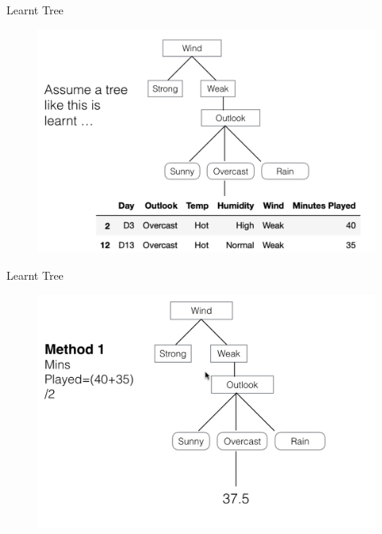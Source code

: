 \documentclass[usenames,dvipsnames]{beamer}
\begin{document}
\begin{frame}{Learnt Tree}
\begin{figure}
    \centering
    \includegraphics[width=1\linewidth]{../assets/decision-trees/diagrams/tree}
    
    \label{fig:tree}
\end{figure}

\end{frame}

\begin{frame}{Learnt Tree}
\begin{figure}
    \centering
    \includegraphics[width=1\linewidth]{../assets/decision-trees/diagrams/tree2}
    
    \label{fig:tree}
\end{figure}

\end{frame}
\end{document}

